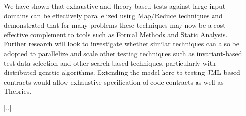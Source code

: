 \documentclass[10pt,journal,cspaper,compsoc]{IEEEtran}
\begin{document}
We have shown that exhaustive and theory-based tests against large input domains can be effectively parallelized using Map/Reduce techniques and demonstrated that for many problems these techniques may now be a cost-effective complement to tools such as Formal Methods and Static Analysis. Further research will look to investigate whether similar techniques can also be adopted to parallelize and scale other testing techniques such as invariant-based test data selection and other search-based techniques, particularly with distributed genetic algorithms. Extending the model here to testing JML-based contracts would allow exhaustive specification of code contracts as well as Theories.

[..]



%
%



%
%
\end{document}
